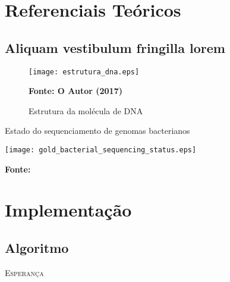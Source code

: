 \chapter{Referenciais Teóricos}
\label{cap:referenciais_teoricos}

\section{Aliquam vestibulum fringilla lorem}

\begin{figure}[!htb]
	\caption{Estrutura da molécula de DNA}
	\label{fig:estrutura_dna}
	\centering
	\texttt{[image: estrutura\_dna.eps]} \\
	\begin{small}\textbf{Fonte: O Autor (2017)}\end{small}
\end{figure}

\lipsum[1]

\begin{grafico}[!htb]
	\caption{Estado do sequenciamento de genomas bacterianos}
	\label{grafico:gold_bacterial_sequencing_status}
	\centering
	\texttt{[image: gold\_bacterial\_sequencing\_status.eps]} \\
	\begin{small}\textbf{Fonte: }\end{small}
\end{grafico}

\lipsum[2-3]

\chapter{Implementação}
\label{cap:implementacao}

\section{Algoritmo}

\begin{algorithm}[H]
   \SetAlgoLined
   \label{alg1}
   \caption{\textsc{Esperança}}
 \end{algorithm}
